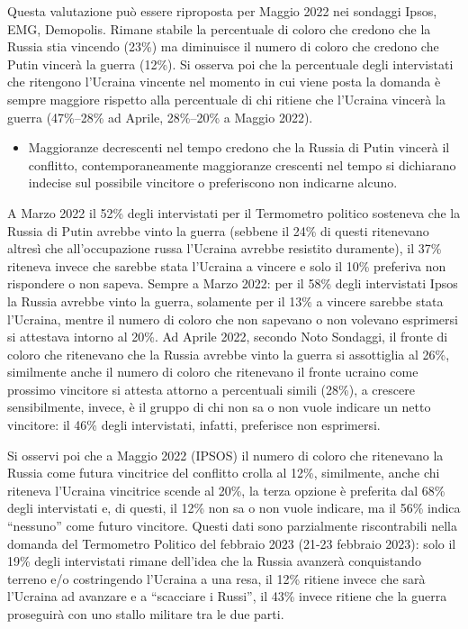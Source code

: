 \documentclass[
  openany]{book}
\providecommand{\tightlist}{%
  \setlength{\itemsep}{0pt}\setlength{\parskip}{0pt}}
\begin{document}
Questa valutazione può essere riproposta per Maggio 2022 nei sondaggi Ipsos, EMG, Demopolis. Rimane stabile la percentuale di coloro che credono che la Russia stia vincendo (23\%) ma diminuisce il numero di coloro che credono che Putin vincerà la guerra (12\%). Si osserva poi che la percentuale degli intervistati che ritengono l'Ucraina vincente nel momento in cui viene posta la domanda è sempre maggiore rispetto alla percentuale di chi ritiene che l'Ucraina vincerà la guerra (47\%--28\% ad Aprile, 28\%--20\% a Maggio 2022).

\begin{itemize}
\tightlist
\item
  Maggioranze decrescenti nel tempo credono che la Russia di Putin vincerà il conflitto, contemporaneamente maggioranze crescenti nel tempo si dichiarano indecise sul possibile vincitore o preferiscono non indicarne alcuno.
\end{itemize}

A Marzo 2022 il 52\% degli intervistati per il Termometro politico sosteneva che la Russia di Putin avrebbe vinto la guerra (sebbene il 24\% di questi ritenevano altresì che all'occupazione russa l'Ucraina avrebbe resistito duramente), il 37\% riteneva invece che sarebbe stata l'Ucraina a vincere e solo il 10\% preferiva non rispondere o non sapeva. Sempre a Marzo 2022: per il 58\% degli intervistati Ipsos la Russia avrebbe vinto la guerra, solamente per il 13\% a vincere sarebbe stata l'Ucraina, mentre il numero di coloro che non sapevano o non volevano esprimersi si attestava intorno al 20\%. Ad Aprile 2022, secondo Noto Sondaggi, il fronte di coloro che ritenevano che la Russia avrebbe vinto la guerra si assottiglia al 26\%, similmente anche il numero di coloro che ritenevano il fronte ucraino come prossimo vincitore si attesta attorno a percentuali simili (28\%), a crescere sensibilmente, invece, è il gruppo di chi non sa o non vuole indicare un netto vincitore: il 46\% degli intervistati, infatti, preferisce non esprimersi.

Si osservi poi che a Maggio 2022 (IPSOS) il numero di coloro che ritenevano la Russia come futura vincitrice del conflitto crolla al 12\%, similmente, anche chi riteneva l'Ucraina vincitrice scende al 20\%, la terza opzione è preferita dal 68\% degli intervistati e, di questi, il 12\% non sa o non vuole indicare, ma il 56\% indica ``nessuno'' come futuro vincitore. Questi dati sono parzialmente riscontrabili nella domanda del Termometro Politico del febbraio 2023 (21-23 febbraio 2023): solo il 19\% degli intervistati rimane dell'idea che la Russia avanzerà conquistando terreno e/o costringendo l'Ucraina a una resa, il 12\% ritiene invece che sarà l'Ucraina ad avanzare e a ``scacciare i Russi'', il 43\% invece ritiene che la guerra proseguirà con uno stallo militare tra le due parti.
\end{document}
